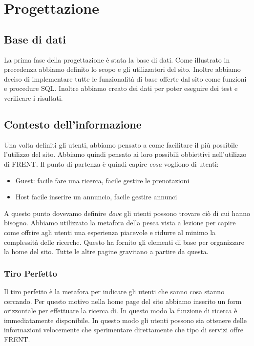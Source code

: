 \documentclass[1_relazione.tex]{subfiles}
\begin{document}
\section{Progettazione}

\subsection{Base di dati}
La prima fase della progettazione è stata la base di dati. Come illustrato in precedenza abbiamo definito lo scopo e gli utilizzatori del sito. Inoltre abbiamo deciso di implementare tutte le funzionalità di base offerte dal sito come funzioni e procedure SQL. Inoltre abbiamo creato dei dati per poter eseguire dei test e verificare i risultati. 

\subsection{Contesto dell'informazione }
Una volta definiti gli utenti, abbiamo pensato a come facilitare il più possibile l'utilizzo del sito. Abbiamo quindi pensato ai loro possibili obbiettivi nell'utilizzo di FRENT. Il punto di partenza è quindi capire \textit{cosa} vogliono di utenti:

\begin{itemize}
\item Guest: facile fare una ricerca, facile gestire le prenotazioni 
\item Host facile inserire un annuncio, facile gestire annunci
\end{itemize}

A questo punto dovevamo definire \textit{dove} gli utenti possono trovare ciò di cui hanno bisogno. Abbiamo utilizzato la metafora della pesca vista a lezione per capire come offrire agli utenti una esperienza piacevole e ridurre al minimo la complessità delle ricerche. Questo ha fornito gli elementi di base per organizzare la home del sito. Tutte le altre pagine gravitano a partire da questa. 

\subsubsection{Tiro Perfetto} 
Il tiro perfetto è la metafora per indicare gli utenti che sanno cosa stanno cercando. Per questo motivo nella home page del sito abbiamo inserito un form orizzontale per effettuare la ricerca di. In questo modo la funzione di ricerca è immediatamente disponibile. In questo modo gli utenti possono sia ottenere delle informazioni velocemente che sperimentare direttamente che tipo di servizi offre FRENT. 
 
\end{document}
